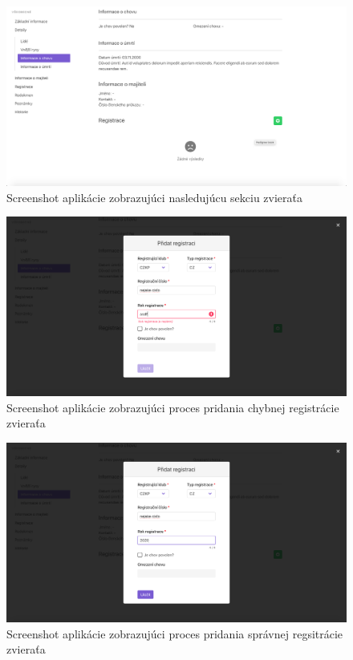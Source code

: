 \vspace*{\fill}

\begin{figure}[H]
	\includegraphics[width=1.0\textwidth]{media/priloha/zviera/registracia/1.png}
	\caption{Screenshot aplikácie zobrazujúci nasledujúcu sekciu zvieraťa}
\end{figure}

\begin{figure}[H]
	\includegraphics[width=1.0\textwidth]{media/priloha/zviera/registracia/2.png}
	\caption{Screenshot aplikácie zobrazujúci proces pridania chybnej registrácie zvieraťa}
\end{figure}

\vspace*{\fill}

\begin{figure}[H]
	\includegraphics[width=1.0\textwidth]{media/priloha/zviera/registracia/3.png}
	\caption{Screenshot aplikácie zobrazujúci proces pridania správnej regsitrácie zvieraťa}
\end{figure}

